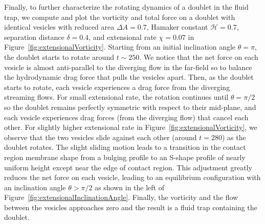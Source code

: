 \documentclass[prf,superscriptaddress,showkeys]{revtex4-1}
\begin{document}
Finally, to further characterize the rotating dynamics of a doublet in
the fluid trap, we compute and plot the vorticity and total force on a
doublet with identical vesicles with reduced area $\Delta A=0.7$,
Hamaker constant $\mathcal{H} = 0.7$, separation distance $\delta =
0.4$, and extensional rate $\chi = 0.07$ in
Figure~\ref{fig:extensionalVorticity}.  Starting from an initial inclination angle $\theta=\pi$, the doublet 
starts to rotate around $t\sim 250$.  We notice that the net force on
each vesicle is almost anti-parallel to the diverging flow in the
far-field so to balance the hydrodynamic drag force that pulls the
vesicles apart.  Then, as the doublet starts to rotate, each vesicle
experiences a drag force from the diverging streaming
flows.  
%
For small extensional rate, the rotation continues until
$\theta = \pi/2$ so the doublet remains perfectly symmetric with respect
to their mid-plane, and each vesicle experiences drag forces (from the diverging flow) that cancel
each other.  
%
For slightly higher extensional rate in Figure~\ref{fig:extensionalVorticity}, we observe
that the two vesicles slide against each other (around $t=280$) as the doublet rotates.
The slight sliding motion leads to a transition in the contact region
membrane shape from a bulging profile to an S-shape profile of nearly
uniform height except near the edge of contact region.  This adjustment
greatly reduces the net force on each vesicle, leading to an equilibrium
configuration with an inclination angle $\theta > \pi/2$ as shown in the
left of Figure~\ref{fig:extensionalInclinationAngle}.  Finally, the
vorticity and the flow between the vesicles approaches zero and the
result is a fluid trap containing the doublet.
\end{document}
